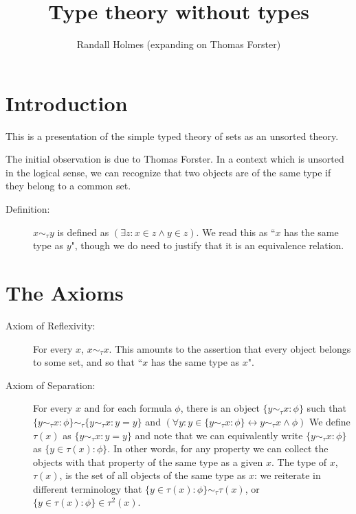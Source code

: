 \documentclass[12pt]{article}
\title{Type theory without types}
\author{Randall Holmes (expanding on Thomas Forster)}
\begin{document}
\maketitle

\tableofcontents

\newpage

\section{Introduction}

This is a presentation of the simple typed theory of sets as an unsorted theory.

The initial observation is due to Thomas Forster.  In a context which is unsorted in the logical sense, we can recognize that two objects are of the same type if they belong to a common set.

\begin{description}

\item[Definition:]  $x \sim_\tau y$ is defined as $(\exists z:x \in z \wedge y \in z)$.  We read this as ``$x$ has the same type as $y$", though we do need to justify that it is an equivalence relation.

\end{description}

\newpage

\section{The Axioms}

\begin{description}

\item[Axiom of Reflexivity:]  For every $x$, $x \sim_\tau x$.  This amounts to the assertion that every object belongs to some set, and so that ``$x$ has the same type as $x$".

\item[Axiom of Separation:]  
For every $x$ and for each formula $\phi$, there is an object $\{y \sim_\tau x:\phi\}$ such that  $\{y \sim_\tau x:\phi\}\sim_\tau\{y \sim_\tau x:y=y\}$ and $(\forall y:y \in \{y \sim_\tau x:\phi\} \leftrightarrow y \sim_\tau x \wedge \phi)$  We define $\tau(x)$ as $\{y \sim_\tau x:y=y\}$ and note that we can equivalently write $\{y \sim_\tau x:\phi\}$ as $\{y \in \tau(x):\phi\}$.  In other words, for any property we can collect the objects with that property of the same type as a given $x$.  The type of $x$, $\tau(x)$, is the set of all objects of the same type as $x$:
we reiterate in different terminology that $\{y \in \tau(x):\phi\} \sim_\tau \tau(x)$, or $\{y \in \tau(x):\phi\} \in \tau^2(x)$.

\end{description}
\end{document}

